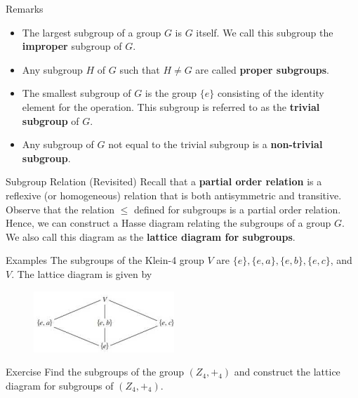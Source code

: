 \documentclass{beamer}
\begin{document}
\begin{frame}{Remarks}
\begin{itemize}
\justifying
\item The largest subgroup of a group $G$ is $G$ itself. We call this subgroup the \textbf{improper} subgroup of $G$.
\pause
\item Any subgroup $H$ of $G$ such that $H \neq G$ are called \textbf{proper subgroups}.
\pause
\item The smallest subgroup of $G$ is the group $\{e\}$ consisting of the identity element for the operation. This subgroup is referred to as the \textbf{trivial subgroup} of $G$.
\pause
\item  Any subgroup of $G$ not equal to the trivial subgroup is a \textbf{non-trivial subgroup}. 
\end{itemize}
\end{frame}

\begin{frame}{Subgroup Relation (Revisited)}
\justifying
Recall that a \textbf{partial order relation} is a reflexive (or homogeneous) relation that is both antisymmetric and transitive. \newline\newline
\pause
Observe that the relation $\leq$ defined for subgroups is a partial order relation. Hence, we can construct a Hasse diagram relating the subgroups of a group $G$. We also call this diagram as the \textbf{lattice diagram for subgroups}.
\end{frame}

\begin{frame}{Examples}
\justifying
The subgroups of the Klein-4 group $V$ are $\{e\}, \{e, a\}, \{e, b\}, \{e, c\}$, and $V$.
\pause\newline\newline
The lattice diagram is given by
\begin{figure}
\centering
\includegraphics{Klein.png}
\end{figure}
\end{frame}

\begin{frame}{Exercise}
\justifying
Find the subgroups of the group $(Z_4, +_4)$ and construct the lattice diagram for subgroups of $(Z_4, +_4)$. 
\end{frame}
\end{document}
